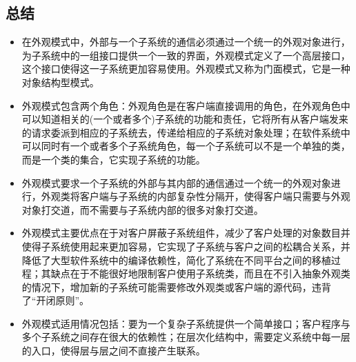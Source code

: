 \documentclass[letterpaper,10pt,english]{sphinxmanual}
\begin{document}
\subsection{总结}
\label{\detokenize{structural_patterns/facade:id15}}\begin{itemize}
\item {} 
\sphinxAtStartPar
在外观模式中，外部与一个子系统的通信必须通过一个统一的外观对象进行，为子系统中的一组接口提供一个一致的界面，外观模式定义了一个高层接口，这个接口使得这一子系统更加容易使用。外观模式又称为门面模式，它是一种对象结构型模式。

\item {} 
\sphinxAtStartPar
外观模式包含两个角色：外观角色是在客户端直接调用的角色，在外观角色中可以知道相关的(一个或者多个)子系统的功能和责任，它将所有从客户端发来的请求委派到相应的子系统去，传递给相应的子系统对象处理；在软件系统中可以同时有一个或者多个子系统角色，每一个子系统可以不是一个单独的类，而是一个类的集合，它实现子系统的功能。

\item {} 
\sphinxAtStartPar
外观模式要求一个子系统的外部与其内部的通信通过一个统一的外观对象进行，外观类将客户端与子系统的内部复杂性分隔开，使得客户端只需要与外观对象打交道，而不需要与子系统内部的很多对象打交道。

\item {} 
\sphinxAtStartPar
外观模式主要优点在于对客户屏蔽子系统组件，减少了客户处理的对象数目并使得子系统使用起来更加容易，它实现了子系统与客户之间的松耦合关系，并降低了大型软件系统中的编译依赖性，简化了系统在不同平台之间的移植过程；其缺点在于不能很好地限制客户使用子系统类，而且在不引入抽象外观类的情况下，增加新的子系统可能需要修改外观类或客户端的源代码，违背了“开闭原则”。

\item {} 
\sphinxAtStartPar
外观模式适用情况包括：要为一个复杂子系统提供一个简单接口；客户程序与多个子系统之间存在很大的依赖性；在层次化结构中，需要定义系统中每一层的入口，使得层与层之间不直接产生联系。

\end{itemize}

\sphinxstepscope
\end{document}
